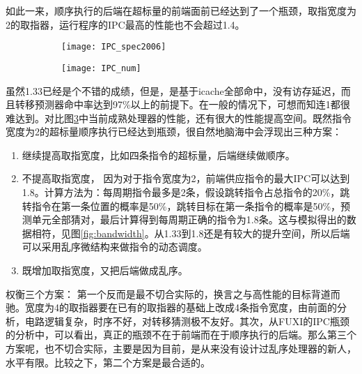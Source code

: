 	如此一来，顺序执行的后端在超标量的前端面前已经达到了一个瓶颈，取指宽度为2的取指器，运行程序的IPC最高的性能也不会超过1.4。
	\begin{figure}[!htbp]
		\centering
	    \begin{subfigure}[b]{0.8\textwidth}
			\texttt{[image: IPC\_spec2006]}
			\caption{}
			\label{fig:ipc_cmp_fig}
		\end{subfigure}
		\begin{subfigure}[b]{0.8\textwidth}
			\texttt{[image: IPC\_num]}
			\caption{}
			\label{fig:ipc_cmp_tbl}
		\end{subfigure}
		\label{fig:ipc_cmp}
	\end{figure}

	虽然1.33已经是个不错的成绩，但是，是基于icache全部命中，没有访存延迟，而且转移预测器命中率达到97\%以上的前提下。在一般的情况下，可想而知连1都很难达到。对比图\ref{fig:ipc_cmp}中当前成熟处理器的性能，还有很大的性能提高空间。既然指令宽度为2的超标量顺序执行已经达到瓶颈，很自然地脑海中会浮现出三种方案：
	\begin{enumerate}[label=(\alph*)]
		\item 继续提高取指宽度，比如四条指令的超标量，后端继续做顺序。
		\item 不提高取指宽度， 因为对于指令宽度为2，前端供应指令的最大IPC可以达到1.8。计算方法为：每周期指令最多是2条，假设跳转指令占总指令的20\%，跳转指令在第一条位置的概率是50\%，跳转目标在第一条指令的概率是50\%，预测单元全部猜对，最后计算得到每周期正确的指令为1.8条。这与模拟得出的数据相符，见图\ref{fig:bandwidth}。从1.33到1.8还是有较大的提升空间，所以后端可以采用乱序微结构来做指令的动态调度。
		\item 既增加取指宽度，又把后端做成乱序。
	\end{enumerate}

	权衡三个方案： 第一个反而是最不切合实际的，换言之与高性能的目标背道而驰。宽度为4的取指器要在已有的取指器的基础上改成4条指令宽度，由前面的分析，电路逻辑复杂，时序不好，对转移猜测极不友好。其次，从FUXI的IPC瓶颈的分析中，可以看出，真正的瓶颈不在于前端而在于顺序执行的后端。那么第三个方案呢，也不切合实际，主要是因为目前，是从来没有设计过乱序处理器的新人，水平有限。比较之下，第二个方案是最合适的。

